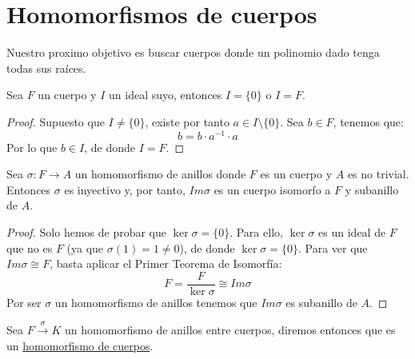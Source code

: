 \section{Homomorfismos de cuerpos}

Nuestro proximo objetivo es buscar cuerpos donde un polinomio dado tenga todas sus raíces.

\begin{lema}
    Sea $F$ un cuerpo y $I$ un ideal suyo, entonces $I = \{0\}$ o $I = F$.
    \begin{proof}
        Supuesto que $I\neq \{0\}$, existe por tanto $a\in I\setminus\{0\}$. Sea $b\in F$, tenemos que:
        \begin{equation*}
            b = b\cdot a^{-1}\cdot a
        \end{equation*}
        Por lo que $b\in I$, de donde $I = F$.
    \end{proof}
\end{lema}

\begin{lema}
    Sea $\sigma:F\to A$ un homomorfismo de anillos donde $F$ es un cuerpo y $A$ es no trivial. Entonces $\sigma$ es inyectivo y, por tanto, $Im \sigma$ es un cuerpo isomorfo a $F$ y subanillo de $A$.
    \begin{proof}
        Solo hemos de probar que $\ker \sigma = \{0\}$. Para ello, $\ker \sigma$ es un ideal de $F$ que no es $F$ (ya que $\sigma(1) = 1\neq 0$), de donde $\ker \sigma = \{0\}$. Para ver que $Im \sigma\cong F$, basta aplicar el Primer Teorema de Isomorfía:
        \begin{equation*}
            F = \dfrac{F}{\ker \sigma} \cong Im \sigma
        \end{equation*}
        Por ser $\sigma$ un homomorfismo de anillos tenemos que $Im\sigma$ es subanillo de $A$.
    \end{proof}
\end{lema}

\begin{definicion}
    Sea $F\stackrel{\sigma}{\to} K$ un homomorfismo de anillos entre cuerpos, diremos entonces que es un \underline{homomorfismo de cuerpos}.
\end{definicion}

